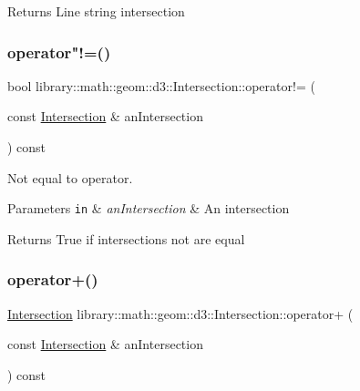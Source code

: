 \begin{DoxyReturn}{Returns}
Line string intersection 
\end{DoxyReturn}
\mbox{\label{classlibrary_1_1math_1_1geom_1_1d3_1_1_intersection_a8e3e47ed63f5c539cc39625b512c4b9e}} 
\subsubsection{\texorpdfstring{operator"!=()}{operator!=()}}
{\footnotesize\ttfamily bool library\+::math\+::geom\+::d3\+::\+Intersection\+::operator!= (\begin{DoxyParamCaption}\item[{const \hyperlink{classlibrary_1_1math_1_1geom_1_1d3_1_1_intersection}{Intersection} \&}]{an\+Intersection }\end{DoxyParamCaption}) const}



Not equal to operator. 


\begin{DoxyParams}[1]{Parameters}
\mbox{\tt in}  & {\em an\+Intersection} & An intersection \\
\hline
\end{DoxyParams}
\begin{DoxyReturn}{Returns}
True if intersections not are equal 
\end{DoxyReturn}
\mbox{\label{classlibrary_1_1math_1_1geom_1_1d3_1_1_intersection_a2b71d1b2a6429a893a8737a4d02c2da6}} 
\subsubsection{\texorpdfstring{operator+()}{operator+()}}
{\footnotesize\ttfamily \hyperlink{classlibrary_1_1math_1_1geom_1_1d3_1_1_intersection}{Intersection} library\+::math\+::geom\+::d3\+::\+Intersection\+::operator+ (\begin{DoxyParamCaption}\item[{const \hyperlink{classlibrary_1_1math_1_1geom_1_1d3_1_1_intersection}{Intersection} \&}]{an\+Intersection }\end{DoxyParamCaption}) const}



